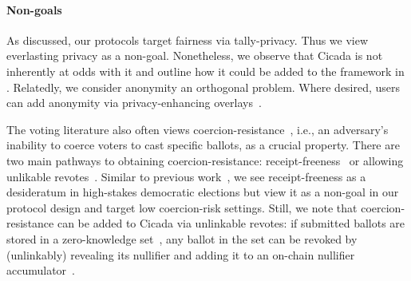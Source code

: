 \paragraph{Non-goals}
As discussed, our protocols target fairness via tally-privacy. Thus we view everlasting privacy as a non-goal. Nonetheless, we observe that Cicada is not inherently at odds with it and outline how it could be added to the framework in .
Relatedly, we consider anonymity an orthogonal problem. Where desired, users can add anonymity via privacy-enhancing overlays~\cite{PerSemSto19,semaphore,CCS:Neff01}. 

The voting literature also often views coercion-resistance~\cite{WPES:JueCatJak05}, i.e., an adversary's inability to coerce voters to cast specific ballots, as a crucial property. There are two main pathways to obtaining coercion-resistance: receipt-freeness~\cite{STOC:BenTui94} or allowing unlikable revotes~\cite{USENIX:LueQueTro20}. Similar to previous work~\cite{USENIX:Adida08}, we see receipt-freeness as a desideratum in high-stakes democratic elections but view it as a non-goal in our protocol design and target low coercion-risk settings. Still, we note that coercion-resistance can be added to Cicada via unlinkable revotes: if submitted ballots are stored in a zero-knowledge set~\cite{semaphore}, any ballot in the set can be revoked by (unlinkably) revealing its nullifier and adding it to an on-chain nullifier accumulator~\cite{rln}.